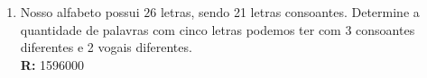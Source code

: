 \documentclass[oneside,a4paper,12pt]{article}
\begin{document}
\begin{enumerate}
	\item Nosso alfabeto possui $26$ letras, sendo 21 letras consoantes. Determine a quantidade de palavras com cinco letras podemos ter com 3 consoantes diferentes e 2 vogais diferentes. \\ {\bf R:} 1596000
	
	











\end{enumerate}


	
\end{document}

